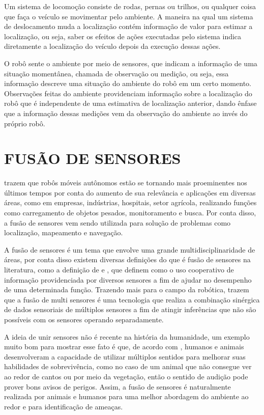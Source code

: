 \documentclass[acronym, symbols]{fei}
\begin{document}
			Um sistema de locomoção consiste de rodas, pernas ou trilhos, ou qualquer coisa que faça o veículo se movimentar pelo ambiente. A maneira na qual um sistema de deslocamento muda a localização contém informação de valor para estimar a localização, ou seja, saber os efeitos de ações executadas pelo sistema indica diretamente a localização do veículo depois da execução dessas ações.
			
			O robô sente o ambiente por meio de sensores, que indicam a informação de uma situação momentânea, chamada de observação ou medição, ou seja, essa informação descreve uma situação do ambiente do robô em um certo momento. Observações feitas do ambiente providenciam informação sobre a localização do robô que é independente de uma estimativa de localização anterior, dando ênfase que a informação dessas medições vem da observação do ambiente ao invés do próprio robô.
	
	\section{FUSÃO DE SENSORES}
	
		\textcite{alatise2020review} trazem que robôs móveis autônomos estão se tornando mais proeminentes nos últimos tempos por conta do aumento de sua relevância e aplicações em diversas áreas, como em empresas, indústrias, hospitais, setor agrícola, realizando funções como carregamento de objetos pesados, monitoramento e busca. Por conta disso, a fusão de sensores vem sendo utilizada para solução de problemas como localização, mapeamento e navegação.
		
		A fusão de sensores é um tema que envolve uma grande multidisciplinaridade de áreas, por conta disso existem diversas definições do que é fusão de sensores na literatura, como a definição de \textcite{castanedo2013review} e \textcite{nagla2014multisensor}, que definem como o uso cooperativo de informação providenciada por diversos sensores a fim de ajudar no desempenho de uma determinada função. Trazendo mais para o campo da robótica, \textcite{luo2011multisensor} trazem que a fusão de multi sensores é uma tecnologia que realiza a combinação sinérgica de dados sensoriais de múltiplos sensores a fim de atingir inferências que não são possíveis com os sensores operando separadamente.
		
		A ideia de unir sensores não é recente na história da humanidade, um exemplo muito bom para mostrar esse fato é que, de acordo com \textcite{hall1997introduction}, humanos e animais desenvolveram a capacidade de utilizar múltiplos sentidos para melhorar suas habilidades de sobrevivência, como no caso de um animal que não consegue ver ao redor de cantos ou por meio da vegetação, então o sentido de audição pode prover bons avisos de perigos. Assim, a fusão de sensores é naturalmente realizada por animais e humanos para uma melhor abordagem do ambiente ao redor e para identificação de ameaças.
		
\end{document}
